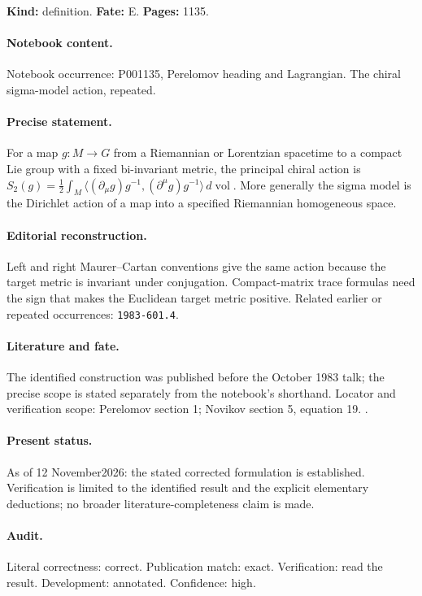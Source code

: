 \noindent\textbf{Kind:} definition. \textbf{Fate:} E. \textbf{Pages:} 1135.\par

\paragraph{Notebook content.} Notebook occurrence: P001135, Perelomov heading and Lagrangian. The chiral sigma-model action, repeated.

\paragraph{Precise statement.} For a map \(g:M\to G\) from a Riemannian or Lorentzian spacetime to a compact Lie group with a fixed bi-invariant metric, the principal chiral action is \(S_2(g)=\frac12\int_M\langle (\partial_\mu g)g^{-1},(\partial^\mu g)g^{-1}\rangle\,d\operatorname{vol}\). More generally the sigma model is the Dirichlet action of a map into a specified Riemannian homogeneous space.

\paragraph{Editorial reconstruction.} Left and right Maurer--Cartan conventions give the same action because the target metric is invariant under conjugation. Compact-matrix trace formulas need the sign that makes the Euclidean target metric positive. Related earlier or repeated occurrences: \texttt{1983-601.4}.

\paragraph{Literature and fate.} The identified construction was published before the October 1983 talk; the precise scope is stated separately from the notebook's shorthand. Locator and verification scope: Perelomov section 1; Novikov section 5, equation 19. \cite{perelomov1981instantons,novikov1982hamiltonian}.

\paragraph{Present status.} As of 12 November2026: the stated corrected formulation is established. Verification is limited to the identified result and the explicit elementary deductions; no broader literature-completeness claim is made.

\paragraph{Audit.} Literal correctness: correct. Publication match: exact. Verification: read the result. Development: annotated. Confidence: high.

